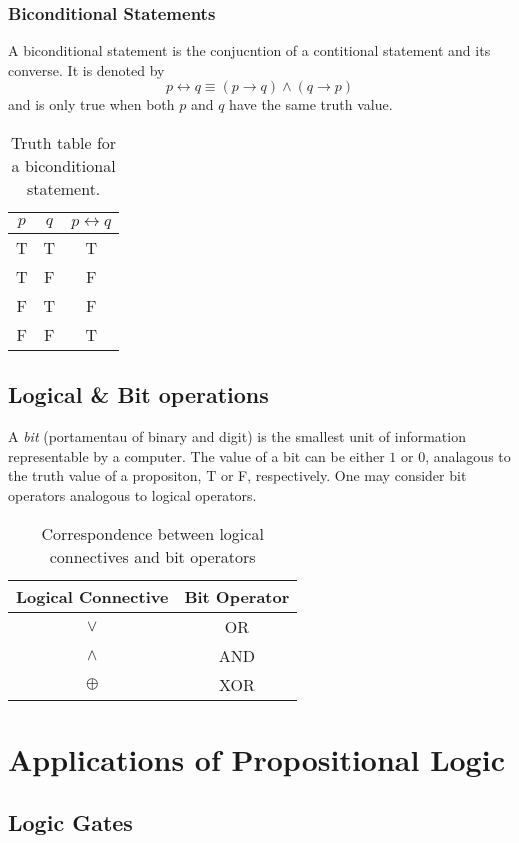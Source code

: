 \documentclass[twocolumn]{report}
\begin{document}
\subsubsection{Biconditional Statements}
A biconditional statement is the conjucntion of a contitional statement and its converse. It is denoted by 
\[
	p \leftrightarrow q \equiv (p \rightarrow q) \wedge (q \rightarrow p)
\]
and is only true when both $p$ and $q$ have the same truth value. 
\begin{table}[h]
	\centering
	\label{tab: biconditional-truth-table}
	\begin{tabular}{cc|c}
		$p$ & $q$ & $p \leftrightarrow q$ \\ \hline
		T & T & T \\
		T & F & F \\
		F & T & F \\
		F & F & T \\
	\end{tabular}
	\caption{Truth table for a biconditional statement.}
\end{table}

\subsection{Logical \& Bit operations}
A \textit{bit} (portamentau of binary and digit) is the smallest unit of information representable by a computer. 
The value of a bit can be either $1$ or $0$, analagous to the truth value of a propositon, T or F, respectively.
One may consider bit operators analogous to logical operators. 
\begin{table}[h]
	\centering
	\label{tab: bit-operators}
	\begin{tabular}{c|c}
		Logical Connective & Bit Operator \\ \hline
		$\lor$ & OR \\
		$\wedge$ & AND \\
		$\oplus$ & XOR \\
	\end{tabular}
	\caption{Correspondence between logical connectives and bit operators}
\end{table}

\section{Applications of Propositional Logic}
\subsection{Logic Gates}
\end{document}
